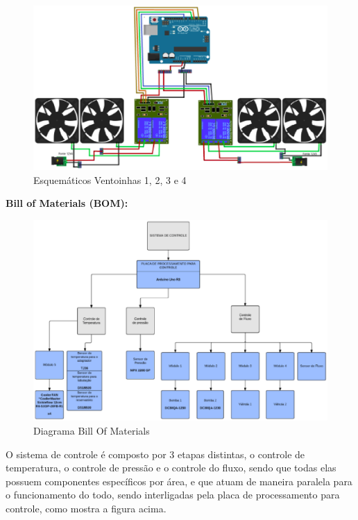 \begin{itemize}
    \begin{figure}[hb]                  
        \centering                          
        \includegraphics[scale=0.7]{figuras/vent1234.eps}
        \caption{ Esquemáticos Ventoinhas 1, 2, 3 e 4 }   \label{figvent1234}              
    \end{figure} 

\end{itemize}
\newpage
\textbf{Bill of Materials (BOM):} 

\begin{figure}[ht]                                          
    \includegraphics[scale=0.8]{figuras/bom.eps}
    \caption{ Diagrama Bill Of Materials }   \label{figbom}              
\end{figure} 

O sistema de controle é composto por 3 etapas distintas, o controle de temperatura, o controle de pressão e o controle do fluxo, sendo que todas elas possuem componentes específicos por área, e que atuam de maneira paralela para o funcionamento do todo, sendo interligadas pela placa de processamento para controle, como mostra a figura acima.

